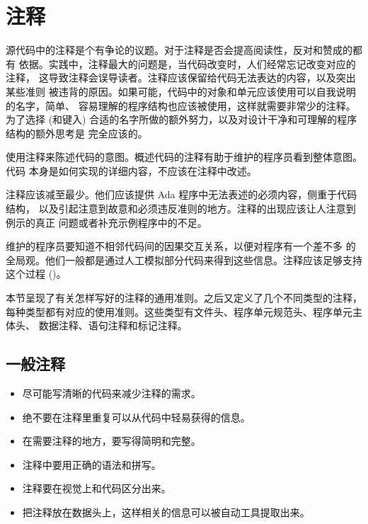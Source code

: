 \section{注释}
源代码中的注释是个有争论的议题。对于注释是否会提高阅读性，反对和赞成的都有
依据。实践中，注释最大的问题是，当代码改变时，人们经常忘记改变对应的注释，
这导致注释会误导读者。注释应该保留给代码无法表达的内容，以及突出某些准则
被违背的原因。如果可能，代码中的对象和单元应该使用可以自我说明的名字，简单、
容易理解的程序结构也应该被使用，这样就需要非常少的注释。为了选择 (和键入)
合适的名字所做的额外努力，以及对设计干净和可理解的程序结构的额外思考是
完全应该的。

使用注释来陈述代码的意图。概述代码的注释有助于维护的程序员看到整体意图。代码
本身是如何实现的详细内容，不应该在注释中改述。

注释应该减至最少。他们应该提供 Ada 程序中无法表述的必须内容，侧重于代码结构，
以及引起注意到故意和必须违反准则的地方。注释的出现应该让人注意到例示的真正
问题或者补充示例程序中的不足。

维护的程序员要知道不相邻代码间的因果交互关系，以便对程序有一个差不多
的全局观。他们一般都是通过人工模拟部分代码来得到这些信息。注释应该足够支持
这个过程 (\cite{soloway86})。

本节呈现了有关怎样写好的注释的通用准则。之后又定义了几个不同类型的注释，
每种类型都有对应的使用准则。这些类型有文件头、程序单元规范头、程序单元主体头、
数据注释、语句注释和标记注释。

\subsection{一般注释}
\begin{itemize}
    \item 尽可能写清晰的代码来减少注释的需求。
    \item 绝不要在注释里重复可以从代码中轻易获得的信息。
    \item 在需要注释的地方，要写得简明和完整。
    \item 注释中要用正确的语法和拼写。
    \item 注释要在视觉上和代码区分出来。
    \item 把注释放在数据头上，这样相关的信息可以被自动工具提取出来。
\end{itemize}

